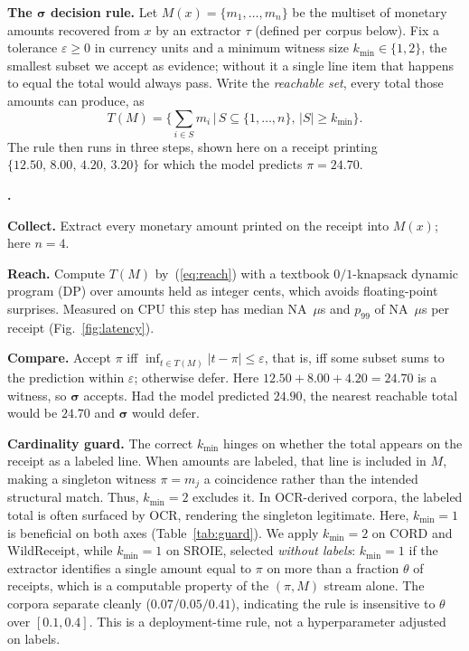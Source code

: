 \documentclass[conference]{IEEEtran}
\newcounter{stepc}
\newenvironment{steps}
  {\begin{list}{\textbf{\arabic{stepc}.}}{\usecounter{stepc}%
    \setlength{\leftmargin}{1.35em}\setlength{\labelwidth}{1.05em}%
    \setlength{\labelsep}{0.3em}\setlength{\itemsep}{1pt}%
    \setlength{\parsep}{0pt}\setlength{\topsep}{2pt}%
    \setlength{\partopsep}{0pt}\setlength{\rightmargin}{0pt}}}
  {\end{list}}
\newcommand{\latMedian}{NA}
\newcommand{\latPNineNine}{NA}
\newcommand{\latUnit}{\ensuremath{\mu}s}
\let\IEEEsigma\sigma
\DeclareRobustCommand{\sigma}{{\boldsymbol{\IEEEsigma}}}
\begin{document}
\noindent\textbf{The $\sigma$ decision rule.} Let $M(x)=\{m_1,\dots,m_n\}$ be the multiset of monetary amounts recovered from $x$ by an extractor $\tau$
(defined per corpus below). Fix a tolerance $\varepsilon\geq0$ in currency
units and a minimum witness size $k_{\min}\in\{1,2\}$, the smallest subset we
accept as evidence; without it a single line item that happens to equal the
total would always pass. Write the \emph{reachable set}, every total those
amounts can produce, as
\begin{equation}
\label{eq:reach}
T(M)=\Big\{\textstyle\sum_{i\in S}m_i\,\Big|\,
   S\subseteq\{1,\dots,n\},\,|S|\geq k_{\min}\Big\}.
\end{equation}
The rule then runs in three steps, shown here on a receipt printing
$\{12.50,\,8.00,\,4.20,\,3.20\}$ for which the model predicts $\pi{=}24.70$.

\begin{steps}
\item \textbf{Collect.} Extract every monetary amount printed on the receipt
into $M(x)$; here $n{=}4$.
\item \textbf{Reach.} Compute $T(M)$ by~(\ref{eq:reach}) with a textbook $0/1$-knapsack dynamic
program (DP) over amounts held as integer cents, which avoids floating-point
surprises. Measured on CPU this step has median \latMedian~\latUnit{} and
$p_{99}$ of \latPNineNine~\latUnit{} per receipt (Fig.~\ref{fig:latency}).
\item \textbf{Compare.} Accept $\pi$ iff
$\inf_{t\in T(M)}|t-\pi|\leq\varepsilon$, that is, iff some subset sums to the
prediction within $\varepsilon$; otherwise defer. Here
$12.50{+}8.00{+}4.20=24.70$ is a witness, so $\sigma$ accepts. Had the model
predicted $24.90$, the nearest reachable total would be $24.70$ and $\sigma$
would defer.
\end{steps}

\noindent\textbf{Cardinality guard.} The correct $k_{\min}$ hinges on whether the total appears on the receipt as a labeled line. When amounts are labeled, that line is included in $M$, making a singleton witness $\pi{=}m_j$ a coincidence rather than the intended structural match. Thus, $k_{\min}{=}2$ excludes it. In OCR-derived corpora, the labeled total is often surfaced by OCR, rendering the singleton legitimate. Here, $k_{\min}{=}1$ is beneficial on both axes (Table~\ref{tab:guard}). We apply $k_{\min}{=}2$ on CORD and WildReceipt, while $k_{\min}{=}1$ on SROIE, selected \emph{without labels}: $k_{\min}{=}1$ if the extractor identifies a single amount equal to $\pi$ on more than a fraction $\theta$ of receipts, which is a computable property of the $(\pi,M)$ stream alone. The corpora separate cleanly ($0.07/0.05/0.41$), indicating the rule is insensitive to $\theta$ over $[0.1,0.4]$. This is a deployment-time rule, not a hyperparameter adjusted on labels.
\end{document}
